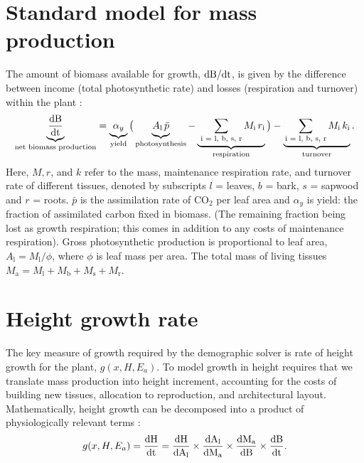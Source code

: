 \documentclass[10pt,twoside]{article}
\begin{document}
\section{Standard model for mass
production}\label{standard-model-for-mass-production}

The amount of biomass available for growth,
\(\rm{d}B / \rm{d}t\), is given by the difference between income
(total photosynthetic rate) and losses (respiration and turnover) within the
plant \citep{Makela-1997, Thornley-2000, Falster-2011}:
\begin{equation}\label{eq:dbdt}
\underbrace{\strut \frac{\rm{d}B}{\rm{d}t}}_\textrm{net biomass production}
  = \underbrace{\strut \alpha_{y}}_\textrm{yield}
    \big( \underbrace{\strut A_\textrm{l} \, \bar{p}}_\textrm{photosynthesis} -
     \underbrace{\strut \, \sum_\textrm{i = l, b, s, r}{M_\textrm{i} \, r_\textrm{i}}}_\textrm{respiration}\big)
    - \underbrace{\strut \sum_\textrm{i = l, b, s, r}{M_\textrm{i} \, k_\textrm{i}}}_\textrm{turnover}.
\end{equation}
Here, \(M, r\), and \(k\) refer to the mass, maintenance respiration rate, and
turnover rate of different tissues, denoted by subscripts \(l\) = leaves,
\(b\) = bark, \(s\) = sapwood and \(r\) = roots. \(\bar{p}\) is the assimilation
rate of CO\(_2\) per leaf area and \(\alpha_{y}\) is yield: the fraction of
assimilated carbon fixed in biomass. (The remaining fraction being lost
as growth respiration; this comes in addition
to any costs of maintenance respiration). Gross photosynthetic production is proportional to leaf area,
\(A_\textrm{l} = M_\textrm{l} / \phi\), where \(\phi\) is leaf mass per
area. The total mass of living tissues
\(M_\textrm{a} = M_\textrm{l} + M_\textrm{b} + M_\textrm{s} + M_\textrm{r}.\)

\section{Height growth rate}\label{height-growth-rate}

The key measure of growth required by the demographic solver is
rate of height growth for the plant, $g(x, H, E_a)$. To model growth in
height requires that we translate mass
production into height increment, accounting for the costs of
building new tissues, allocation
to reproduction, and architectural layout. Mathematically, height growth
can be decomposed into a product of physiologically relevant terms
\citep{Falster-2011}:
\begin{equation} \label{eq:dhdt}
g(x, H, E_a) = \frac{\rm{d}H}{\rm{d}t} = \frac{\rm{d}H}{\rm{d}A_\textrm{l}}
\times \frac{\rm{d}A_\textrm{l}}{\rm{d}M_\textrm{a}}
\times \frac{\rm{d}M_\textrm{a}}{\rm{d}B}
\times \frac{\rm{d}B}{\rm{d}t}.
\end{equation}
\end{document}
